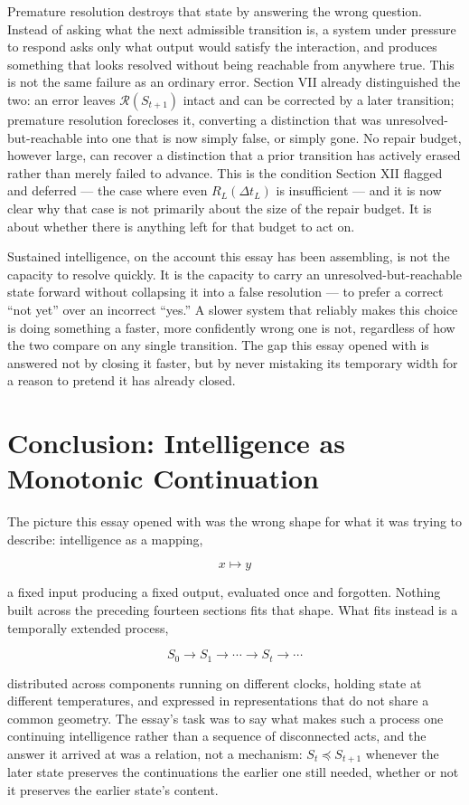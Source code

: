 \documentclass[11pt]{article}
\begin{document}
Premature resolution destroys that state by answering the wrong question. Instead of asking what the next admissible transition is, a system under pressure to respond asks only what output would satisfy the interaction, and produces something that looks resolved without being reachable from anywhere true. This is not the same failure as an ordinary error. Section VII already distinguished the two: an error leaves $\mathcal{R}(S_{t+1})$ intact and can be corrected by a later transition; premature resolution forecloses it, converting a distinction that was unresolved-but-reachable into one that is now simply false, or simply gone. No repair budget, however large, can recover a distinction that a prior transition has actively erased rather than merely failed to advance. This is the condition Section XII flagged and deferred --- the case where even $R_L(\Delta t_L)$ is insufficient --- and it is now clear why that case is not primarily about the size of the repair budget. It is about whether there is anything left for that budget to act on.

Sustained intelligence, on the account this essay has been assembling, is not the capacity to resolve quickly. It is the capacity to carry an unresolved-but-reachable state forward without collapsing it into a false resolution --- to prefer a correct ``not yet'' over an incorrect ``yes.'' A slower system that reliably makes this choice is doing something a faster, more confidently wrong one is not, regardless of how the two compare on any single transition. The gap this essay opened with is answered not by closing it faster, but by never mistaking its temporary width for a reason to pretend it has already closed.

\section{Conclusion: Intelligence as Monotonic Continuation}

The picture this essay opened with was the wrong shape for what it was trying to describe: intelligence as a mapping,

\[
x \mapsto y
\]

a fixed input producing a fixed output, evaluated once and forgotten. Nothing built across the preceding fourteen sections fits that shape. What fits instead is a temporally extended process,

\[
S_0 \to S_1 \to \cdots \to S_t \to \cdots
\]

distributed across components running on different clocks, holding state at different temperatures, and expressed in representations that do not share a common geometry. The essay's task was to say what makes such a process one continuing intelligence rather than a sequence of disconnected acts, and the answer it arrived at was a relation, not a mechanism: $S_t \preceq S_{t+1}$ whenever the later state preserves the continuations the earlier one still needed, whether or not it preserves the earlier state's content.
\end{document}

